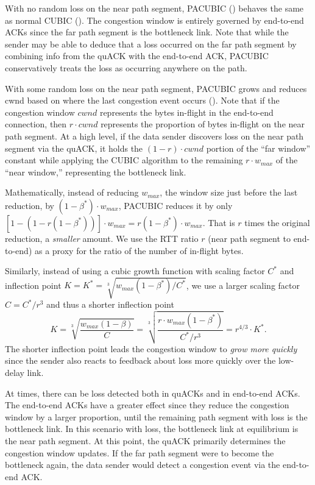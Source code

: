 With no random loss on the near path segment, PACUBIC ()
behaves the same as normal CUBIC ().
The congestion window is entirely governed by end-to-end ACKs since
the far path segment is the bottleneck link. Note that while the sender may be
able to deduce that a loss occurred on the far path segment by combining info from
the quACK with the end-to-end ACK, PACUBIC conservatively treats the loss as
occurring anywhere on the path.

With some random loss on the near path segment, PACUBIC grows and reduces cwnd
based on where the last congestion event occurs ().
Note that if the congestion window $cwnd$
represents the bytes in-flight in the end-to-end connection, then
$r \cdot cwnd$ represents the proportion of bytes in-flight on the near
path segment. At a high level, if the data sender discovers loss
on the near path segment via the quACK, it holds the $(1-r)\cdot cwnd$ portion of
the ``far window'' constant while applying the CUBIC algorithm to the remaining
$r \cdot w_{max}$ of the ``near window,'' representing the bottleneck link.

Mathematically, instead of reducing $w_{max}$, the window size just before the
last reduction, by $(1-\beta^*) \cdot w_{max}$, PACUBIC reduces it by only
$[1 - (1-r(1-\beta^*))] \cdot w_{max} = r(1-\beta^*) \cdot w_{max}$.
That is $r$ times the original reduction, a \emph{smaller} amount.
We use the RTT ratio $r$ (near path segment to end-to-end)
as a proxy for the ratio of the number of in-flight bytes.

Similarly, instead of using a cubic growth function with scaling factor $C^*$
and inflection point $K = K^* = \sqrt[3]{w_{max}(1-\beta^*)/C^*}$,
we use a larger scaling factor $C = C^*/r^3$
and thus a shorter inflection point
\[
K = \sqrt[3]{\frac{w_{max}(1-\beta)}{C}}
= \sqrt[3]{\frac{r\cdot w_{max}(1-\beta^*)}{C^* / r^3}}
= r^{4/3} \cdot K^*.
\]
The shorter inflection point leads the congestion window to \emph{grow more
quickly} since the sender also reacts to feedback about loss more quickly over
the low-delay link.

At times, there can be loss detected both in quACKs and in end-to-end ACKs.
The end-to-end ACKs have a greater effect since they reduce the congestion
window by a larger proportion, until the remaining path segment with loss is the
bottleneck link. In this scenario with loss, the bottleneck link at equilibrium
is the near path segment.
At this point, the quACK primarily determines the congestion window updates.
If the far path segment were to become the bottleneck again, the data sender would
detect a congestion event via the end-to-end ACK.

